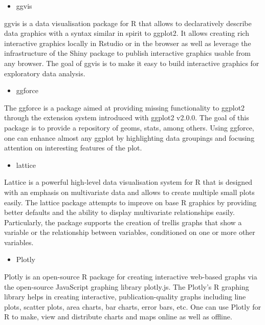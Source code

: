 \documentclass[
]{report}
\providecommand{\tightlist}{%
  \setlength{\itemsep}{0pt}\setlength{\parskip}{0pt}}
\begin{document}
\begin{itemize}
\tightlist
\item
  ggvis
\end{itemize}

ggvis is a data visualisation package for R that allows to declaratively describe data graphics with a syntax similar in spirit to ggplot2. It allows creating rich interactive graphics locally in Rstudio or in the browser as well as leverage the infrastructure of the Shiny package to publish interactive graphics usable from any browser. The goal of ggvis is to make it easy to build interactive graphics for exploratory data analysis.

\begin{itemize}
\tightlist
\item
  ggforce
\end{itemize}

The ggforce is a package aimed at providing missing functionality to ggplot2 through the extension system introduced with ggplot2 v2.0.0. The goal of this package is to provide a repository of geoms, stats, among others. Using ggforce, one can enhance almost any ggplot by highlighting data groupings and focusing attention on interesting features of the plot.

\begin{itemize}
\tightlist
\item
  lattice
\end{itemize}

Lattice is a powerful high-level data visualisation system for R that is designed with an emphasis on multivariate data and allows to create multiple small plots easily. The lattice package attempts to improve on base R graphics by providing better defaults and the ability to display multivariate relationships easily. Particularly, the package supports the creation of trellis graphs that show a variable or the relationship between variables, conditioned on one or more other variables.

\begin{itemize}
\tightlist
\item
  Plotly
\end{itemize}

Plotly is an open-source R package for creating interactive web-based graphs via the open-source JavaScript graphing library plotly.js. The Plotly's R graphing library helps in creating interactive, publication-quality graphs including line plots, scatter plots, area charts, bar charts, error bars, etc. One can use Plotly for R to make, view and distribute charts and maps online as well as offline.
\end{document}
